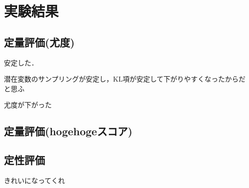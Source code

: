 \section{実験結果}
\subsection{定量評価(尤度)}

安定した．

潜在変数のサンプリングが安定し，KL項が安定して下がりやすくなったからだと思ふ

尤度が下がった

\subsection{定量評価(hogehogeスコア)}
\subsection{定性評価}
きれいになってくれ
